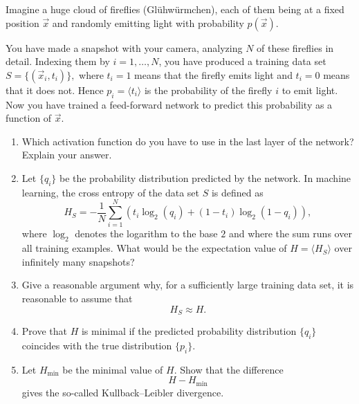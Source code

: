 \begin{Problem}[Fireflies]
Imagine a huge cloud of fireflies (Glühwürmchen), each of them being at a fixed position
$\vec x$ and randomly emitting light with probability $p(\vec x)$.

You have made a snapshot with your camera, analyzing $N$ of these fireflies in detail.
Indexing them by $i=1,\ldots,N$, you have produced a training data set $S=\{(\vec x_i,t_i)\},$ where $t_i=1$ means that the firefly emits light and $t_i=0$ means that it does not.
Hence $p_i=\langle t_i\rangle$ is the probability of the firefly $i$ to emit light. Now you have trained a feed-forward
network to predict this probability as a function of $\vec x$.

\begin{enumerate}
\item[(a)] Which activation function do you have to use in the last layer of the network?
Explain your answer.

\item[(b)] Let $\{q_i\}$ be the probability distribution predicted by the network.
In machine learning, the cross entropy of the data set $S$ is defined as
\[
H_S
=
-\frac1N
\sum_{i=1}^{N}
\left(
t_i \log_2(q_i)
+
(1-t_i)\log_2(1-q_i)
\right),
\]
where $\log_2$ denotes the logarithm to the base $2$ and where the sum runs over all
training examples. What would be the expectation value of $H= \langle H_S\rangle$
over infinitely many snapshots?

\item[(c)] Give a reasonable argument why, for a sufficiently large training data set,
it is reasonable to assume that
\[
H_S \approx H .
\]

\item[(d)] Prove that $H$ is minimal if the predicted probability distribution
$\{q_i\}$ coincides with the true distribution $\{p_i\}$.

\item[(e)] Let $H_{\min}$ be the minimal value of $H$.
Show that the difference
\[
H-H_{\min}
\]
gives the so-called Kullback--Leibler divergence.
\end{enumerate}
\end{Problem}
